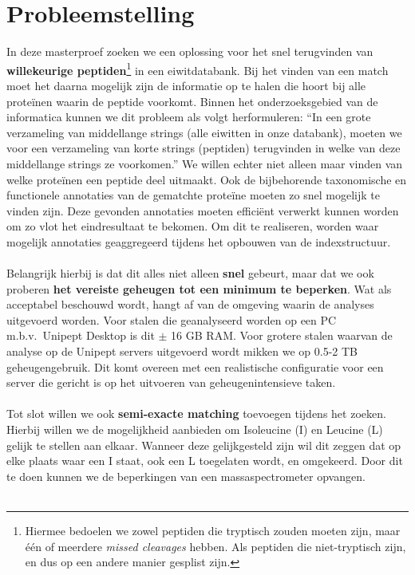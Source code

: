 \section{Probleemstelling}\label{sec:probleemstelling}
In deze masterproef zoeken we een oplossing voor het snel terugvinden van \textbf{willekeurige peptiden}\footnote{Hiermee bedoelen we zowel peptiden die tryptisch zouden moeten zijn, maar één of meerdere \textit{missed cleavages} hebben. Als peptiden die niet-tryptisch zijn, en dus op een andere manier gesplist zijn.} in een eiwitdatabank.
Bij het vinden van een match moet het daarna mogelijk zijn de informatie op te halen die hoort bij alle proteïnen waarin de peptide voorkomt.
Binnen het onderzoeksgebied van de informatica kunnen we dit probleem als volgt herformuleren:
``In een grote verzameling van middellange strings (alle eiwitten in onze databank), moeten we voor een verzameling van korte strings (peptiden) terugvinden in welke van deze middellange strings ze voorkomen.''
We willen echter niet alleen maar vinden van welke proteïnen een peptide deel uitmaakt.
Ook de bijbehorende taxonomische en functionele annotaties van de gematchte proteïne moeten zo snel mogelijk te vinden zijn.
Deze gevonden annotaties moeten efficiënt verwerkt kunnen worden om zo vlot het eindresultaat te bekomen.
Om dit te realiseren, worden waar mogelijk annotaties geaggregeerd tijdens het opbouwen van de indexstructuur.
\\ \\
Belangrijk hierbij is dat dit alles niet alleen \textbf{snel} gebeurt, maar dat we ook proberen \textbf{het vereiste geheugen tot een minimum te beperken}.
Wat als acceptabel beschouwd wordt, hangt af van de omgeving waarin de analyses uitgevoerd worden.
Voor stalen die geanalyseerd worden op een PC m.b.v.~Unipept Desktop is dit $\pm$ 16 GB RAM\@.
Voor grotere stalen waarvan de analyse op de Unipept servers uitgevoerd wordt mikken we op 0.5-2 TB geheugengebruik.
Dit komt overeen met een realistische configuratie voor een server die gericht is op het uitvoeren van geheugenintensieve taken.
\\ \\
Tot slot willen we ook \textbf{semi-exacte matching} toevoegen tijdens het zoeken.
Hierbij willen we de mogelijkheid aanbieden om Isoleucine (I) en Leucine (L) gelijk te stellen aan elkaar.
Wanneer deze gelijkgesteld zijn wil dit zeggen dat op elke plaats waar een I staat, ook een L toegelaten wordt, en omgekeerd.
Door dit te doen kunnen we de beperkingen van een massaspectrometer opvangen.
\\ \\
